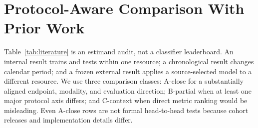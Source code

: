 \section{Protocol-Aware Comparison With Prior Work}

Table~\ref{tab:literature} is an estimand audit, not a classifier leaderboard.
An internal result trains and tests within one resource; a chronological result
changes calendar period; and a frozen external result applies a source-selected
model to a different resource. We use three comparison classes: A-close for a
substantially aligned endpoint, modality, and evaluation direction; B-partial
when at least one major protocol axis differs; and C-context when direct metric
ranking would be misleading. Even A-close rows are not formal head-to-head
tests because cohort releases and implementation details differ.

